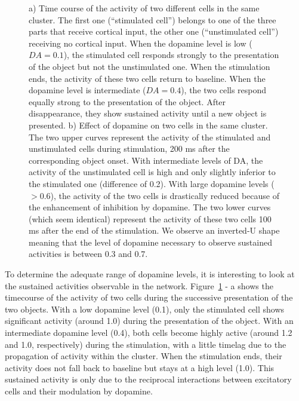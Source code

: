 \documentclass[
  11pt,
  a4paper,
]{scrbook}
\begin{document}
\begin{figure}


\caption{\label{fig-jocn:inputtest}a) Time course of the activity of two
different cells in the same cluster. The first one (``stimulated cell'')
belongs to one of the three parts that receive cortical input, the other
one (``unstimulated cell'') receiving no cortical input. When the
dopamine level is low (\(DA = 0.1\)), the stimulated cell responds
strongly to the presentation of the object but not the unstimulated one.
When the stimulation ends, the activity of these two cells return to
baseline. When the dopamine level is intermediate (\(DA = 0.4\)), the
two cells respond equally strong to the presentation of the object.
After disappearance, they show sustained activity until a new object is
presented. b) Effect of dopamine on two cells in the same cluster. The
two upper curves represent the activity of the stimulated and
unstimulated cells during stimulation, 200 ms after the corresponding
object onset. With intermediate levels of DA, the activity of the
unstimulated cell is high and only slightly inferior to the stimulated
one (difference of 0.2). With large dopamine levels (\(> 0.6\)), the
activity of the two cells is drastically reduced because of the
enhancement of inhibition by dopamine. The two lower curves (which seem
identical) represent the activity of these two cells 100 ms after the
end of the stimulation. We observe an inverted-U shape meaning that the
level of dopamine necessary to observe sustained activities is between
0.3 and 0.7.}

\end{figure}%

To determine the adequate range of dopamine levels, it is interesting to
look at the sustained activities observable in the network.
Figure~\ref{fig-jocn:inputtest} - a shows the timecourse of the activity
of two cells during the successive presentation of the two objects. With
a low dopamine level (0.1), only the stimulated cell shows significant
activity (around 1.0) during the presentation of the object. With an
intermediate dopamine level (0.4), both cells become highly active
(around 1.2 and 1.0, respectively) during the stimulation, with a little
timelag due to the propagation of activity within the cluster. When the
stimulation ends, their activity does not fall back to baseline but
stays at a high level (1.0). This sustained activity is only due to the
reciprocal interactions between excitatory cells and their modulation by
dopamine.
\end{document}
